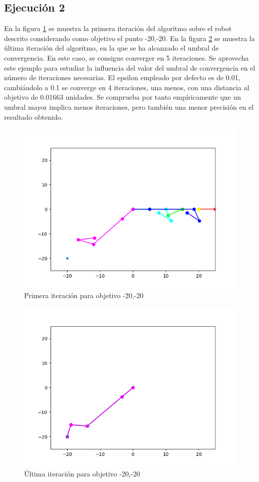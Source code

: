 \subsection{Ejecución 2}
En la figura \ref{chapter:ccd_ejemplo3} se muestra la primera iteración del algoritmo sobre el robot descrito considerando como objetivo el punto -20,-20.
En la figura \ref{chapter:ccd_ejemplo4} se muestra la última iteración del algoritmo, en la que se ha alcanzado el umbral de convergencia. En este caso, se consigue converger en 5 iteraciones.
Se aprovecha este ejemplo para estudiar la influencia del valor del umbral de convergencia en el número de iteraciones necesarias. El epsilon empleado por defecto es de 0.01, cambiándolo a 0.1 se converge en 4 iteraciones, una menos, con una distancia al objetivo de 0.01663 unidades. 
Se comprueba por tanto empíricamente que un umbral mayor implica menos iteraciones, pero también una menor precisión en el resultado obtenido.
\begin{figure}[htb]
   \centering
   \includegraphics[width=.8\linewidth]{images/ccd_7.png}
   \caption{Primera iteración para objetivo -20,-20}
   \label{chapter:ccd_ejemplo3}
\end{figure}
\begin{figure}[htb]
   \centering
   \includegraphics[width=.8\linewidth]{images/ccd_9.png}
   \caption{Última iteración para objetivo -20,-20}
   \label{chapter:ccd_ejemplo4}
\end{figure}


